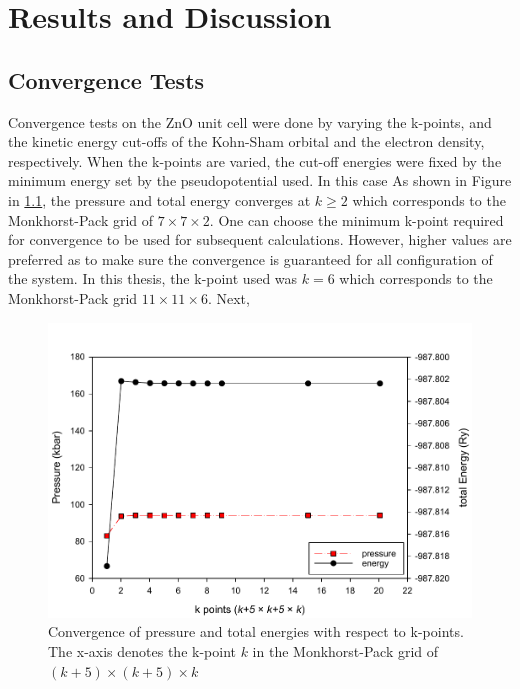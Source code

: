 \chapter{Results and Discussion}
\section{Convergence Tests}
Convergence tests on the ZnO unit cell were done by varying the k-points, and the kinetic energy cut-offs  of the Kohn-Sham orbital and the electron density, respectively. When the k-points are varied, the cut-off energies  were fixed by the minimum energy set by the pseudopotential used. In this case  As shown in Figure in \ref{fig:conv_k}, the pressure and total energy converges at $k \geq 2$ which corresponds to the Monkhorst-Pack grid of $7 \times 7 \times 2$. One can choose the minimum k-point required for convergence to be used for subsequent calculations. However, higher values are preferred as to make sure the convergence is guaranteed for all configuration of the system. In this thesis, the k-point used was $k = 6$ which corresponds to the Monkhorst-Pack grid $11 \times 11 \times 6$. Next, 

\begin{figure}[tbh!] 
	\centering
	\includegraphics[width=0.8\linewidth]{"images/rnd/kpoints"}
	\caption[Convergence of pressure and total energies with respect to k-points]{Convergence of pressure and total energies with respect to k-points. The x-axis denotes the k-point $k$ in the Monkhorst-Pack grid of $(k+5) \times (k +5 ) \times k$}
	\label{fig:conv_k}
\end{figure}

